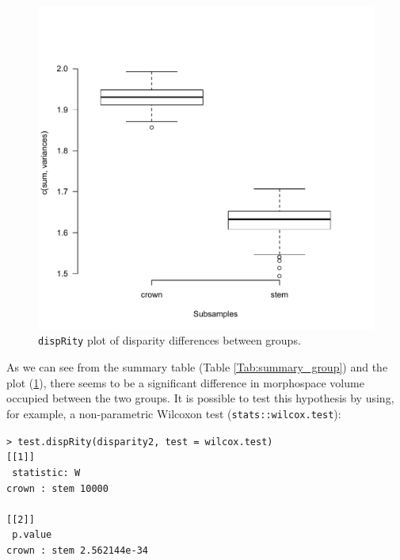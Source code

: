 \documentclass[12pt,letterpaper]{article}
\newcommand{\disp}{\texttt{dispRity} }
\begin{document}
\begin{figure}[!htbp]
\centering
   \includegraphics[width=1\textwidth]{plot_example_group.pdf} 
\caption{\disp plot of disparity differences between groups.}
\label{Fig:plot_group}
\end{figure}

As we can see from the summary table (Table \ref{Tab:summary_group}) and the plot (\ref{Fig:plot_group}), there seems to be a significant difference in morphospace volume occupied between the two groups.
It is possible to test this hypothesis by using, for example, a non-parametric Wilcoxon test (\texttt{stats::wilcox.test}):

\noindent \texttt{> test.dispRity(disparity2, test = wilcox.test)}\\

\noindent \texttt{[[1]]}\\
\noindent \texttt{          statistic: W}\\
\noindent \texttt{crown : stem     10000}\\
\noindent \texttt{ }\\
\noindent \texttt{[[2]]}\\
\noindent \texttt{                  p.value}\\
\noindent \texttt{crown : stem 2.562144e-34}\\
\end{document}
